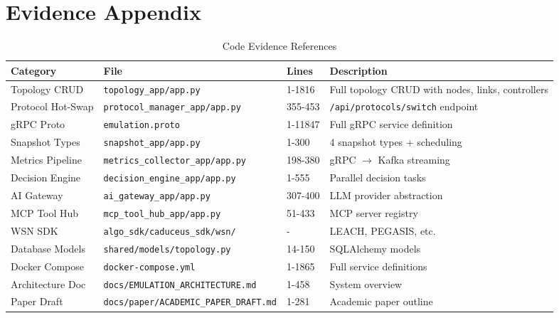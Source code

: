 \documentclass[10pt,a4paper]{article}
\begin{document}
\section{Evidence Appendix}

\begin{table}[htbp]
\centering
\caption{Code Evidence References}
\begin{tabularx}{\textwidth}{lXXX}
\toprule
\textbf{Category} & \textbf{File} & \textbf{Lines} & \textbf{Description} \\
\midrule
Topology CRUD & \texttt{topology\_app/app.py} & 1-1816 & Full topology CRUD with nodes, links, controllers \\
Protocol Hot-Swap & \texttt{protocol\_manager\_app/app.py} & 355-453 & \texttt{/api/protocols/switch} endpoint \\
gRPC Proto & \texttt{emulation.proto} & 1-11847 & Full gRPC service definition \\
Snapshot Types & \texttt{snapshot\_app/app.py} & 1-300 & 4 snapshot types + scheduling \\
Metrics Pipeline & \texttt{metrics\_collector\_app/app.py} & 198-380 & gRPC $\to$ Kafka streaming \\
Decision Engine & \texttt{decision\_engine\_app/app.py} & 1-555 & Parallel decision tasks \\
AI Gateway & \texttt{ai\_gateway\_app/app.py} & 307-400 & LLM provider abstraction \\
MCP Tool Hub & \texttt{mcp\_tool\_hub\_app/app.py} & 51-433 & MCP server registry \\
WSN SDK & \texttt{algo\_sdk/caduceus\_sdk/wsn/} & - & LEACH, PEGASIS, etc. \\
Database Models & \texttt{shared/models/topology.py} & 14-150 & SQLAlchemy models \\
Docker Compose & \texttt{docker-compose.yml} & 1-1865 & Full service definitions \\
Architecture Doc & \texttt{docs/EMULATION\_ARCHITECTURE.md} & 1-458 & System overview \\
Paper Draft & \texttt{docs/paper/ACADEMIC\_PAPER\_DRAFT.md} & 1-281 & Academic paper outline \\
\bottomrule
\end{tabularx}
\end{table}
\end{document}
